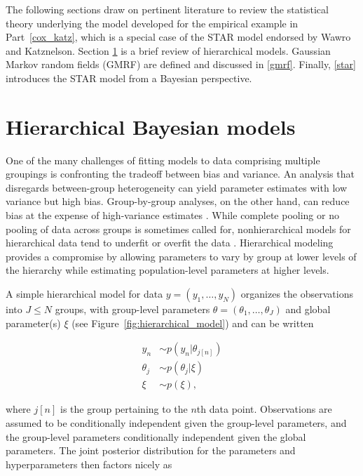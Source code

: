 The following sections draw on pertinent literature to review the statistical theory underlying 
the model developed for the empirical example in Part~\ref{cox_katz}, which is a special case 
of the STAR model endorsed by Wawro and Katznelson. Section \ref{hierarchical} is a brief review 
of hierarchical models. Gaussian Markov random fields (GMRF) are defined and discussed 
in \ref{gmrf}. Finally, \ref{star} introduces the STAR model from a Bayesian perspective. 



\section{Hierarchical Bayesian models}
\label{hierarchical}

One of the many challenges of fitting models to data comprising multiple groupings is 
confronting the tradeoff between bias and variance. An analysis that disregards between-group 
heterogeneity can yield parameter estimates with low variance but high bias. Group-by-group 
analyses, on the other hand, can reduce bias at the expense of high-variance estimates . While complete pooling or no pooling of data across 
groups is sometimes called for, nonhierarchical models for hierarchical data tend to underfit 
or overfit the data . Hierarchical modeling provides a 
compromise by allowing parameters to vary by group at lower levels of the hierarchy while 
estimating population-level parameters at higher levels. 

A simple hierarchical model for data $y = (y_1, \dots, y_N)$ organizes the observations into $J \leq N$ 
groups, with group-level parameters $\theta = (\theta_1, \dots, \theta_J)$ and global parameter(s) $\xi$ 
(see Figure~\ref{fig:hierarchical_model}) and can be written

\begin{align*}
y_n &\sim p(y_n | \theta_{j[n]}) \\
\theta_j &\sim p(\theta_j | \xi) \\
\xi &\sim p(\xi),
\end{align*}

\noindent where $j[n]$ is the group pertaining to the $n$th data point. Observations are assumed 
to be conditionally independent given the group-level parameters, and the group-level parameters 
conditionally independent given the global parameters. The joint posterior distribution for the 
parameters and hyperparameters then factors nicely as

